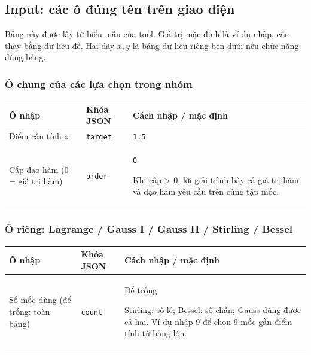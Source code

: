 \subsection*{Input: các ô đúng tên trên giao diện}
Bảng này được lấy từ biểu mẫu của tool. Giá trị mặc định là ví dụ nhập, cần thay bằng dữ liệu đề. Hai dãy $x,y$ là bảng dữ liệu riêng bên dưới nếu chức năng dùng bảng.
\subsubsection*{Ô chung của các lựa chọn trong nhóm}
\begin{center}\small\begin{tabular}{@{}p{.32\linewidth}p{.17\linewidth}p{.43\linewidth}@{}}\toprule
Ô nhập & Khóa JSON & Cách nhập / mặc định\\\midrule
Điểm cần tính x & \texttt{target} & \texttt{1.5}\\[3pt]
Cấp đạo hàm (0 = giá trị hàm) & \texttt{order} & \texttt{0}
\par Khi cấp > 0,\allowbreak{} lời giải trình bày cả giá trị hàm và đạo hàm yêu cầu trên cùng tập mốc.\\[3pt]
\bottomrule\end{tabular}\end{center}
\subsubsection*{Ô riêng: Lagrange /\allowbreak{} Gauss I /\allowbreak{} Gauss II /\allowbreak{} Stirling /\allowbreak{} Bessel}
\begin{center}\small\begin{tabular}{@{}p{.32\linewidth}p{.17\linewidth}p{.43\linewidth}@{}}\toprule
Ô nhập & Khóa JSON & Cách nhập / mặc định\\\midrule
Số mốc dùng (để trống: toàn bảng) & \texttt{count} & Để trống
\par Stirling: số lẻ;\allowbreak{} Bessel: số chẵn;\allowbreak{} Gauss dùng được cả hai. Ví dụ nhập 9 để chọn 9 mốc gần điểm tính từ bảng lớn.\\[3pt]
\bottomrule\end{tabular}\end{center}
